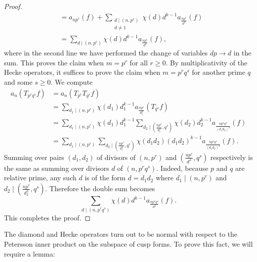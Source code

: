 \begin{proof}
\begin{align*}
          &= a_{np^{r}}(f)+\sum_{\substack{d \mid (n,p^{r}) \\ d \neq 1}}\chi(d)d^{k-1}a_{\frac{np^{r}}{d^{2}}}(f) \\
          &= \sum_{d \mid (n,p^{r})}\chi(d)d^{k-1}a_{\frac{np^{r}}{d^{2}}}(f),
        \end{align*}
        where in the second line we have performed the change of variables $dp \to d$ in the sum. This proves the claim when $m = p^{r}$ for all $r \ge 0$. By multiplicativity of the Hecke operators, it suffices to prove the claim when $m = p^{r}q^{s}$ for another prime $q$ and some $s \ge 0$. We compute
        \begin{align*}
          a_{n}(T_{p^{r}q^{s}}f) &= a_{n}(T_{p^{r}}T_{q^{s}}f) \\
          &= \sum_{d_{1} \mid (n,p^{r})}\chi(d_{1})d_{1}^{k-1}a_{\frac{np^{r}}{d_{1}^{2}}}(T_{q^{s}}f) \\
          &= \sum_{d_{1} \mid (n,p^{r})}\chi(d_{1})d_{1}^{k-1}\sum_{d_{2} \mid \left(\frac{np^{r}}{d_{1}^{2}},q^{s}\right)}\chi(d_{2})d_{2}^{k-1}a_{\frac{np^{r}q^{s}}{(d_{1}d_{2})^{2}}}(f) \\
          &= \sum_{d_{1} \mid (n,p^{r})}\sum_{d_{2} \mid \left(\frac{np^{r}}{d_{1}^{2}},q^{s}\right)}\chi(d_{1}d_{2})(d_{1}d_{2})^{k-1}a_{\frac{np^{r}q^{s}}{(d_{1}d_{2})^{2}}}(f).
        \end{align*}
        Summing over pairs $(d_{1},d_{2})$ of divisors of $(n,p^{r})$ and $\left(\frac{np^{r}}{d^{2}},q^{s}\right)$ respectively is the same as summing over divisors $d$ of $(n,p^{r}q^{s})$. Indeed, because $p$ and $q$ are relative prime, any such $d$ is of the form $d = d_{1}d_{2}$ where $d_{1} \mid (n,p^{r})$ and $d_{2} \mid \left(\frac{np^{r}}{d_{2}^{2}},q^{s}\right)$. Therefore the double sum becomes
        \[
          \sum_{d \mid (n,p^{r}q^{s})}\chi(d)d^{k-1}a_{\frac{np^{r}q^{s}}{d^{2}}}(f).
        \]
        This completes the proof.
      \end{proof}

      The diamond and Hecke operators turn out to be normal with respect to the Petersson inner product on the subspace of cusp forms. To prove this fact, we will require a lemma:

